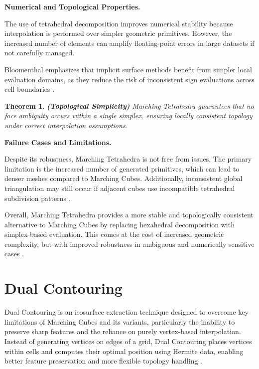 \documentclass[12pt, a4paper, oneside]{book}
\theoremstyle{plain}
\newtheorem{theorem}{Theorem}[chapter]
\theoremstyle{definition}
\theoremstyle{remark}
\theoremstyle{definition}
\begin{document}
\vspace{0.5em}

\textbf{Numerical and Topological Properties.}

The use of tetrahedral decomposition improves numerical stability because interpolation is performed over simpler geometric primitives. However, the increased number of elements can amplify floating-point errors in large datasets if not carefully managed.

Bloomenthal emphasizes that implicit surface methods benefit from simpler local evaluation domains, as they reduce the risk of inconsistent sign evaluations across cell boundaries \cite{bloomenthal1997introduction}.

\begin{theorem}
    \textbf{(Topological Simplicity)}
Marching Tetrahedra guarantees that no face ambiguity occurs within a single simplex, ensuring locally consistent topology under correct interpolation assumptions.

\end{theorem}

\vspace{0.5em}

\textbf{Failure Cases and Limitations.}

Despite its robustness, Marching Tetrahedra is not free from issues. The primary limitation is the increased number of generated primitives, which can lead to denser meshes compared to Marching Cubes. Additionally, inconsistent global triangulation may still occur if adjacent cubes use incompatible tetrahedral subdivision patterns \cite{nielson2008dual}.

\vspace{0.5em}

Overall, Marching Tetrahedra provides a more stable and topologically consistent alternative to Marching Cubes by replacing hexahedral decomposition with simplex-based evaluation. This comes at the cost of increased geometric complexity, but with improved robustness in ambiguous and numerically sensitive cases \cite{shirley1990marching,treece1999regularised,nielson2008dual}.


\section{Dual Contouring}

Dual Contouring is an isosurface extraction technique designed to overcome key limitations of Marching Cubes and its variants, particularly the inability to preserve sharp features and the reliance on purely vertex-based interpolation. Instead of generating vertices on edges of a grid, Dual Contouring places vertices within cells and computes their optimal position using Hermite data, enabling better feature preservation and more flexible topology handling \cite{ju2002dual}.
\end{document}
